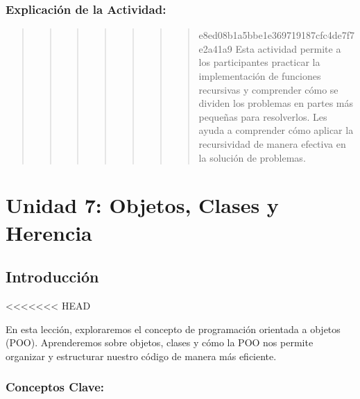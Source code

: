 \documentclass[
  a4paper,
  onepage,
  openany]{scrreprt}
\begin{document}
\hypertarget{explicaciuxf3n-de-la-actividad-45}{%
\section{Explicación de la
Actividad:}\label{explicaciuxf3n-de-la-actividad-45}}

\begin{quote}
\begin{quote}
\begin{quote}
\begin{quote}
\begin{quote}
\begin{quote}
\begin{quote}
e8ed08b1a5bbe1e369719187cfc4de7f7e2a41a9 Esta actividad permite a los
participantes practicar la implementación de funciones recursivas y
comprender cómo se dividen los problemas en partes más pequeñas para
resolverlos. Les ayuda a comprender cómo aplicar la recursividad de
manera efectiva en la solución de problemas.
\end{quote}
\end{quote}
\end{quote}
\end{quote}
\end{quote}
\end{quote}
\end{quote}

\part{Unidad 7: Objetos, Clases y Herencia}

\hypertarget{introducciuxf3n}{%
\chapter{Introducción}\label{introducciuxf3n}}

\textless\textless\textless\textless\textless\textless\textless{} HEAD

En esta lección, exploraremos el concepto de programación orientada a
objetos (POO). Aprenderemos sobre objetos, clases y cómo la POO nos
permite organizar y estructurar nuestro código de manera más eficiente.

\hypertarget{conceptos-clave-48}{%
\section{Conceptos Clave:}\label{conceptos-clave-48}}
\end{document}
